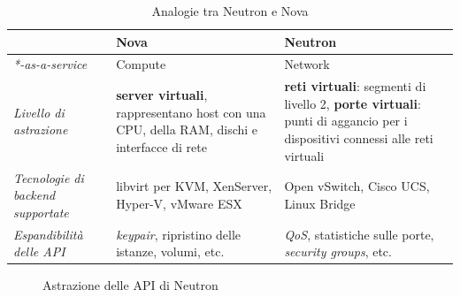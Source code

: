 \documentclass[../main.tex]{subfiles}
\begin{document}
\begin{table}[h]
\centering
\begin{tabular}{| m{3cm}| m{5cm} | m{5cm} | }
\hline
& \textbf{Nova} & \textbf{Neutron} \\ \hline
\textit{*-as-a-service} & Compute & Network \\ \hline
\textit{Livello di astrazione} & \textbf{server virtuali}, rappresentano host con una CPU, della RAM, dischi e interfacce di rete & \textbf{reti virtuali}: segmenti di livello 2, \textbf{porte virtuali}: punti di aggancio per i dispositivi connessi alle reti virtuali \\ \hline
\textit{Tecnologie di backend supportate} & libvirt per KVM, XenServer, Hyper-V, vMware ESX & Open vSwitch, Cisco UCS, Linux Bridge \\ \hline
\textit{Espandibilità delle API} & \textit{keypair}, ripristino delle istanze, volumi, etc. & \textit{QoS}, statistiche sulle porte, \textit{security groups}, etc. \\ \hline

\end{tabular}
\caption{Analogie tra Neutron e Nova}
\label{tab:AnalogiesNeutronNova}
\end{table}
\begin{figure}[H]
\centering
{}
\caption{Astrazione delle API di Neutron\cite{NeutronNova}}\label{NeutronNova}
\end{figure}
\end{document}
